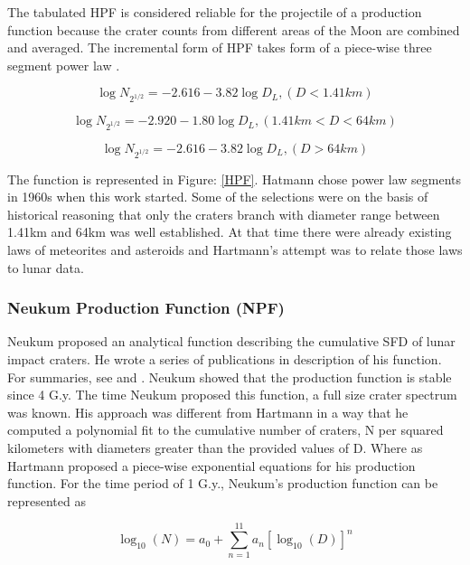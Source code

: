 \documentclass[11pt]{article}
\begin{document}
The tabulated HPF is considered reliable for the projectile of a production function because the crater counts from different areas of the Moon are combined and averaged. The incremental form of HPF takes form of a piece-wise three segment power law \cite{ivanov2002comparison}.

\begin{equation}
\log N_{2^{1/2}} = -2.616 - 3.82 \log D_{L}, (D<1.41km)
\end{equation}

\begin{equation}
\log N_{2^{1/2}} = -2.920 - 1.80 \log D_{L},
(1.41km < D < 64km)
\end{equation}

\begin{equation}
\log N_{2^{1/2}} = -2.616 - 3.82 \log D_{L},
(D>64km)
\end{equation}

The function is represented in Figure: \ref{HPF}. Hatmann chose power law segments in 1960s when this work started. Some of the selections were on the basis of historical reasoning that only the craters branch with diameter range between 1.41km and 64km was well established. At that time there were already existing laws of meteorites and asteroids and Hartmann's attempt was to relate those laws to lunar data.

\subsubsection{Neukum Production Function (NPF)}
Neukum proposed an analytical function describing the cumulative SFD of lunar impact craters. He wrote a series of publications in description of his function. For summaries, see \cite{neukum1994crater} and \cite{neukum1983meteoritenbombardement}. Neukum showed that the production function is stable since 4 G.y. The time Neukum proposed this function, a full size crater spectrum was known. His approach was different from Hartmann in a way that he computed a polynomial fit to the cumulative number of craters, N per squared kilometers with diameters greater than the provided values of D. Where as Hartmann proposed a piece-wise exponential equations for his production function. For the time period of 1 G.y., Neukum's production function can be represented as

\begin{equation}
\log_{10} (N) = a_0 + \sum_{n=1}^{11} a_n[\log_{10} (D)]^n
\end{equation}
\end{document}
